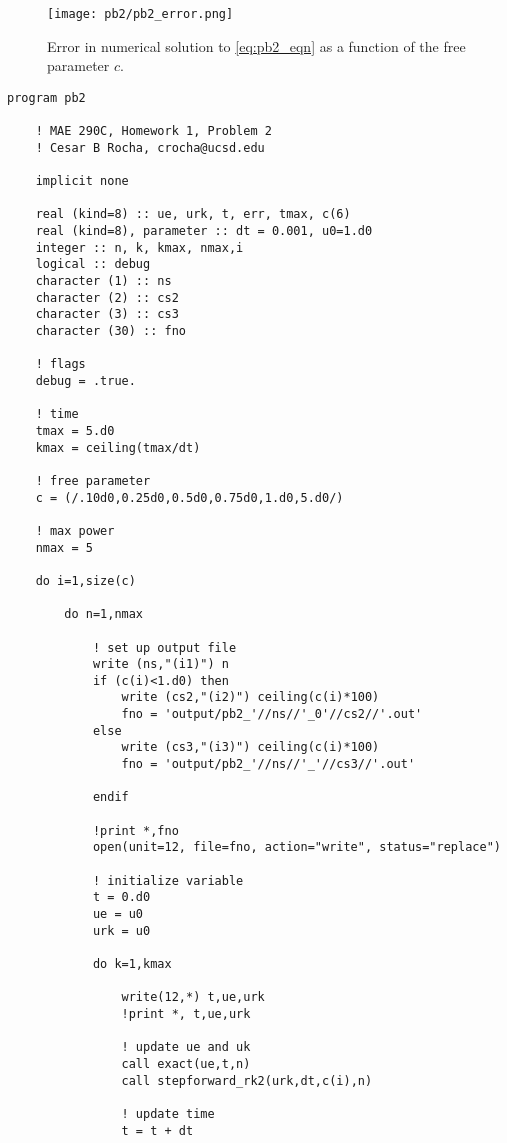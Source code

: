 \documentclass[11pt]{article}
\begin{document}
\begin{figure}[ht]
\begin{center}
\texttt{[image: pb2/pb2\_error.png]}
\end{center}
\caption{Error in numerical solution to \eqref{eq:pb2_eqn} as a function of the free parameter $c$.}
\label{fig:pb2_error}
\end{figure}

\begin{lstlisting}
program pb2

    ! MAE 290C, Homework 1, Problem 2
    ! Cesar B Rocha, crocha@ucsd.edu

    implicit none

    real (kind=8) :: ue, urk, t, err, tmax, c(6)
    real (kind=8), parameter :: dt = 0.001, u0=1.d0
    integer :: n, k, kmax, nmax,i
    logical :: debug
    character (1) :: ns
    character (2) :: cs2
    character (3) :: cs3
    character (30) :: fno

    ! flags
    debug = .true.

    ! time
    tmax = 5.d0
    kmax = ceiling(tmax/dt)

    ! free parameter
    c = (/.10d0,0.25d0,0.5d0,0.75d0,1.d0,5.d0/)

    ! max power
    nmax = 5

    do i=1,size(c)

        do n=1,nmax

            ! set up output file
            write (ns,"(i1)") n
            if (c(i)<1.d0) then
                write (cs2,"(i2)") ceiling(c(i)*100)
                fno = 'output/pb2_'//ns//'_0'//cs2//'.out'
            else
                write (cs3,"(i3)") ceiling(c(i)*100)
                fno = 'output/pb2_'//ns//'_'//cs3//'.out'

            endif
            
            !print *,fno
            open(unit=12, file=fno, action="write", status="replace")

            ! initialize variable
            t = 0.d0
            ue = u0
            urk = u0

            do k=1,kmax

                write(12,*) t,ue,urk
                !print *, t,ue,urk
            
                ! update ue and uk
                call exact(ue,t,n)
                call stepforward_rk2(urk,dt,c(i),n)

                ! update time
                t = t + dt


\end{lstlisting}
\end{document}
